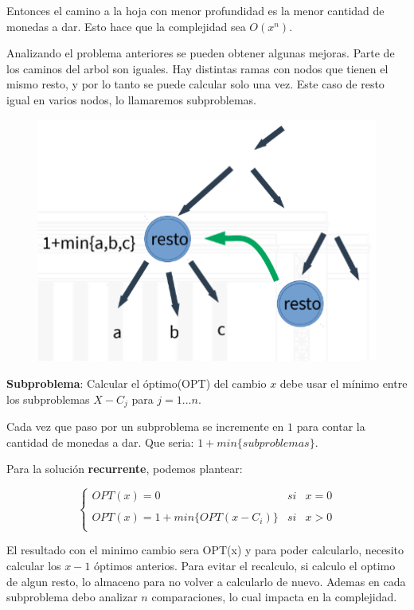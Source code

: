 \documentclass{article}
\begin{document}
Entonces el camino a la hoja con menor profundidad es la menor cantidad de monedas a dar. Esto hace que la complejidad sea \(O(x^n)\).

Analizando el problema anteriores se pueden obtener algunas mejoras. 
Parte de los caminos del arbol son iguales. 
Hay distintas ramas con nodos que tienen el mismo resto, 
y por lo tanto se puede calcular solo una vez. 
Este caso de resto igual en varios nodos, lo llamaremos subproblemas.

\begin{figure}[h!]
    \includegraphics[scale=0.5]{imagenes/dinamico-moneda-subproblema.png}
\end{figure}

\newpage
\textbf{Subproblema}: Calcular el óptimo(OPT) del cambio \(x\) debe usar el mínimo entre los subproblemas \(X - C_j\) para \(j=1...n\).

Cada vez que paso por un subproblema se incremente en \(1\) para contar la cantidad de monedas a dar. 
Que seria: \(1+min\{subproblemas\}\).

Para la solución \textbf{recurrente}, podemos plantear:

    \[
        \left\{ \begin{array}{lcc}
            OPT(x) = 0 &   si  & x = 0 \\
            \\ OPT(x) = 1+min\{OPT(x-C_i)\} &  si & x > 0 \\
            \end{array}
        \right.
    \]

El resultado con el minimo cambio sera OPT(x) y para poder calcularlo, 
necesito calcular los \(x-1\) óptimos anterios. 
Para evitar el recalculo, si calculo el optimo de algun resto, 
lo almaceno para no volver a calcularlo de nuevo.
Ademas en cada subproblema debo analizar \(n\) comparaciones, lo cual impacta en la complejidad.
\end{document}
